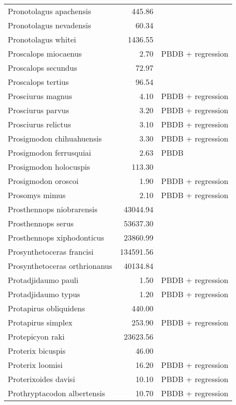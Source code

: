 \begin{table}[ht]
\begin{tabular}{lrl}
  Pronotolagus apachensis & 445.86 & \cite{Tomiya2013} \\ 
  Pronotolagus nevadensis & 60.34 & \cite{Tomiya2013} \\ 
  Pronotolagus whitei & 1436.55 & \cite{Tomiya2013} \\ 
  Proscalops miocaenus & 2.70 & PBDB + regression \\ 
  Proscalops secundus & 72.97 & \cite{Tomiya2013} \\ 
  Proscalops tertius & 96.54 & \cite{Tomiya2013} \\ 
  Prosciurus magnus & 4.10 & PBDB + regression \\ 
  Prosciurus parvus & 3.20 & PBDB + regression \\ 
  Prosciurus relictus & 3.10 & PBDB + regression \\ 
  Prosigmodon chihuahuensis & 3.30 & PBDB + regression \\ 
  Prosigmodon ferrusquiai & 2.63 & PBDB \\ 
  Prosigmodon holocuspis & 113.30 & \cite{Tomiya2013} \\ 
  Prosigmodon oroscoi & 1.90 & PBDB + regression \\ 
  Prosomys mimus & 2.10 & PBDB + regression \\ 
  Prosthennops niobrarensis & 43044.94 & \cite{Tomiya2013} \\ 
  Prosthennops serus & 53637.30 & \cite{Tomiya2013} \\ 
  Prosthennops xiphodonticus & 23860.99 & \cite{Tomiya2013} \\ 
  Prosynthetoceras francisi & 134591.56 & \cite{Tomiya2013} \\ 
  Prosynthetoceras orthrionanus & 40134.84 & \cite{Tomiya2013} \\ 
  Protadjidaumo pauli & 1.50 & PBDB + regression \\ 
  Protadjidaumo typus & 1.20 & PBDB + regression \\ 
  Protapirus obliquidens & 440.00 & \cite{Rose1982a} \\ 
  Protapirus simplex & 253.90 & PBDB + regression \\ 
  Protepicyon raki & 23623.56 & \cite{Tomiya2013} \\ 
  Proterix bicuspis & 46.00 & \cite{Coombs1979} \\ 
  Proterix loomisi & 16.20 & PBDB + regression \\ 
  Proterixoides davisi & 10.10 & PBDB + regression \\ 
  Prothryptacodon albertensis & 10.70 & PBDB + regression \\ 

\end{tabular}
\end{table}
